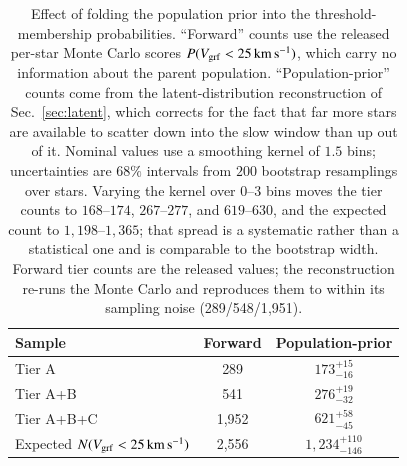 \begin{table}
\caption{Effect of folding the population prior into the threshold-membership
  probabilities.  ``Forward'' counts use the released per-star Monte Carlo
  scores $P(V_{\mathrm{grf}}<25\,\mathrm{km\,s^{-1}})$, which carry no information about the parent
  population.  ``Population-prior'' counts come from the latent-distribution
  reconstruction of Sec.~\ref{sec:latent}, which corrects for the fact that
  far more stars are available to scatter down into the slow window than up
  out of it.  Nominal values use a smoothing kernel of $1.5$ bins;
  uncertainties are $68\%$ intervals from $200$ bootstrap resamplings over
  stars.  Varying the kernel over $0$--$3$ bins moves the tier counts to
  $168$--$174$, $267$--$277$, and $619$--$630$, and the expected count to
  $1{,}198$--$1{,}365$; that spread is a systematic rather than a statistical
  one and is comparable to the bootstrap width.  Forward tier counts are the
  released values; the reconstruction re-runs the Monte Carlo and reproduces
  them to within its sampling noise (289/548/1{,}951).}
\label{tab:latent_deconvolution}
\centering
\begin{tabular}{lcc}
\hline\hline
Sample & Forward & Population-prior \\
\hline
Tier A     &     289 & $173^{+15}_{-16}$ \\
Tier A+B   &     541 & $276^{+19}_{-32}$ \\
Tier A+B+C & 1{,}952 & $621^{+58}_{-45}$ \\
\hline
Expected $N(V_{\mathrm{grf}}<25\,\mathrm{km\,s^{-1}})$ & 2{,}556 & $1{,}234^{+110}_{-146}$ \\
\hline
\end{tabular}
\end{table}
